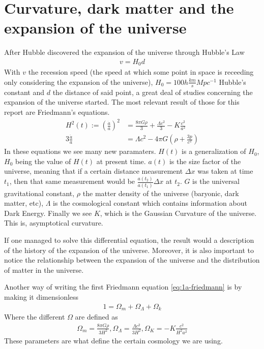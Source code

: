 \section{Curvature, dark matter and the expansion of the universe}
After Hubble discovered the expansion of the universe through Hubble's Law
\begin{align}
	v = H_0 d
	\label{eq:ley-hubble}
\end{align}
With $v$ the recession speed (the speed at which some point in space is receeding only considering the expansion of the universe), $H_0=100h \frac{km}{s}Mpc ^{-1}$ Hubble's constant and $d$ the distance of said point, a great deal of studies concerning the expansion of the universe started. The most relevant result of those for this report are Friedmann's equations.
\begin{align}
	H^2(t) := \left(\frac{\dot a}{a}\right)^2 &=  \frac{8\pi G \rho}{3} +\frac{  \Lambda c^2}{3} - K \frac{c^2}{a^2}
	\label{eq:1a-friedmann}\\
	3 \frac{\ddot a}{a} &= \Lambda c^2 - 4\pi G \left( \rho + \frac{3p}{c^2} \right) 
	\label{eq:2a-friedmann}
\end{align}
In these equations we see many new paramaters. $H(t)$ is a generalization of $H_0$, $H_0$ being the value of $H(t)$ at present time. $a(t)$ is the size factor of the universe, meaning that if a certain distance measurement $\Delta x$ was taken at time $t_1$, then that same measurement would be $\frac{a(t_2)}{a(t_1)}\Delta x$ at $t_2$. $G$ is the universal gravitational constant, $\rho$ the matter density of the universe (baryonic, dark matter, etc), $\Lambda$ is the cosmological constant which contains information about Dark Energy. Finally we see $K$, which is the Gaussian Curvature of the universe. This is, asymptotical curvature.

If one managed to solve this differential equation, the result would a description of the history of the expansion of the universe. Moreover, it is also important to notice the relationship between the expansion of the universe and the distribution of matter in the universe.


Another way of writing the first Friedmann equation \eqref{eq:1a-friedmann} is by making it dimensionless 
\begin{align}
	1 = \Omega_m + \Omega_\Lambda + \Omega_k
\end{align}
Where the different $\Omega$ are defined as
\begin{align}
\Omega_m = \frac{8\pi G \rho}{3H^2}, \Omega_\Lambda = \frac{\Lambda c^2}{3H^2}, \Omega_K = -K\frac{c^2}{H^2a^2} 
\end{align}
These parameters are what define the certain cosmology we are using.

